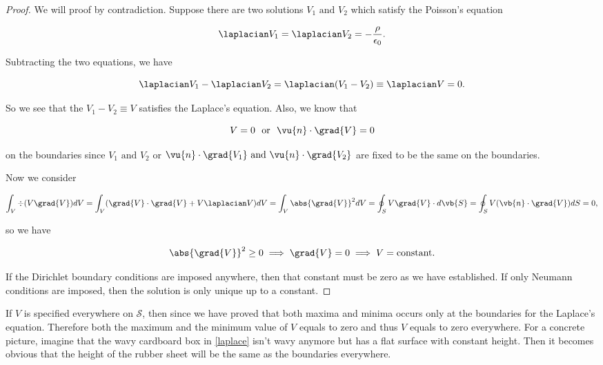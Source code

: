 \documentclass[english,a4paper,12pt]{report}
\begin{document}
\begin{proof}
We will proof by contradiction. Suppose there are two solutions \(V_1 \text{ and } V_2\) which satisfy the Poisson's equation

\begin{equation}
    \laplacian V_1 = \laplacian V_2 = -\frac{\rho }{\epsilon_0} .
\end{equation}

Subtracting the two equations, we have 

\begin{equation}
    \laplacian V_1 - \laplacian V_2 = \laplacian (V_1 - V_2) \equiv \laplacian V= 0.
\end{equation}

So we see that the \(V_1 - V_2 \equiv V\) satisfies the Laplace's equation. Also, we know that 

\begin{equation}
    V = 0 ~\text { or }~ \vu{n} \cdot \grad{V} = 0 
\end{equation}

on the boundaries since \(V_1 \text { and } V_2 \) or \(\vu{n} \cdot \grad{V_1 } \text { and } \vu{n} \cdot \grad{V_2 }  \) are fixed to be the same on the boundaries. 

Now we consider 

\begin{equation}
    \int_{V}^{} \div{(V\grad{V} )} dV = \int_{V}^{} (\grad{V } \cdot \grad{V} + V\laplacian V  ) dV = \int_{V}^{} \abs{\grad{V} }^2dV = \oint_{S} V {\grad{V}} \cdot d\vb{S} = \oint_{S} V(\vb{n} \cdot \grad{V} ) dS = 0,       
\end{equation}

so we have 

\begin{equation}
    \abs{\grad{V} }^2 \ge 0 \implies \grad{V} =0 \implies  V = \text{constant}.
\end{equation}

If the Dirichlet boundary conditions are imposed anywhere, then that constant must be zero as we have established. If only Neumann conditions are imposed, then the solution is only unique up to a constant.

\end{proof}

If \(V\) is specified everywhere on \(\mathcal{S}\), then since we have proved that both maxima and minima occurs only at the boundaries for the Laplace's equation. Therefore both the maximum and the minimum value of \(V\) equals to zero and thus \(V\) equals to zero everywhere. For a concrete picture, imagine that the wavy cardboard box in \cref{laplace} isn't wavy anymore but has a flat surface with constant height. Then it becomes obvious that the height of the rubber sheet will be the same as the boundaries everywhere.
\end{document}
